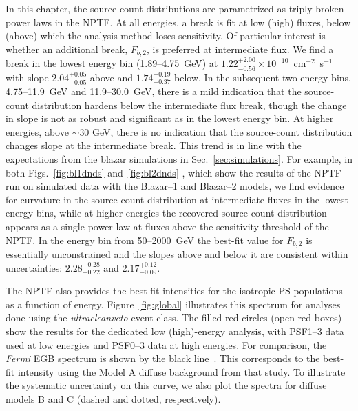 In this chapter, the source-count distributions are parametrized as triply-broken power laws in the NPTF.  At all energies, a break is fit at low (high) fluxes, below (above) which the analysis method loses sensitivity.  Of particular interest is whether an additional break, $F_{b,2}$, is preferred at intermediate flux.  We find a break in the lowest energy bin (1.89--4.75~GeV) at $1.22_{-0.56}^{+2.00}\times10^{-10}$~cm$^{-2}$~s$^{-1}$ with slope $2.04_{-0.05}^{+0.05}$ above and $1.74_{-0.37}^{+0.19}$ below.  In the subsequent two energy bins, 4.75--11.9~GeV and 11.9--30.0~GeV, there is a mild indication that the source-count distribution hardens below the intermediate flux break, though the change in slope is not as robust and significant as in the lowest energy bin.  At higher energies, above $\sim$30 GeV, there is no indication that the source-count distribution changes slope at the intermediate break.  This trend is in line with the expectations from the blazar simulations in Sec.~\ref{sec:simulations}.  For example, in both Figs.~\ref{fig:bl1dnds} and~\ref{fig:bl2dnds}%
, which show the results of the NPTF run on simulated data with the Blazar--1 and Blazar--2 models, we find evidence for curvature in the source-count distribution at intermediate fluxes in the lowest energy bins, while at higher energies the recovered source-count distribution appears as a single power law at fluxes above the sensitivity threshold of the NPTF.  In the energy bin from 50--2000~GeV the best-fit value for $F_{b,2}$ is essentially unconstrained and the slopes above and below it are consistent within uncertainties:  $2.28_{-0.22}^{+0.28}$ and $2.17_{-0.09}^{+0.12}$. 


The NPTF also provides the best-fit intensities for the isotropic-PS populations as a function of energy.  Figure~\ref{fig:global} illustrates this spectrum for analyses done using the {\it ultracleanveto} event class.  The filled red circles (open red boxes) show the results for the dedicated low (high)-energy analysis, with PSF1--3 data used at low energies and PSF0--3 data at high energies.  For comparison, the \emph{Fermi} EGB spectrum is shown by the black line~\cite{Ackermann:2014usa}.  This corresponds to the best-fit intensity using the Model A diffuse background from that study.  To illustrate the systematic uncertainty on this curve, we also plot the spectra for diffuse models B and C (dashed and dotted, respectively).


